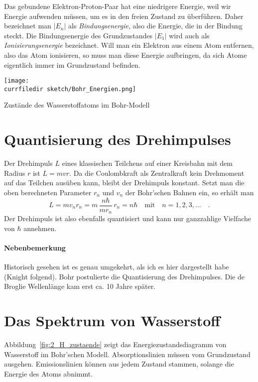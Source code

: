 Das gebundene Elektron-Proton-Paar hat eine niedrigere Energie, weil wir Energie aufwenden müssen, um es in den freien Zustand zu überführen. Daher bezeichnet man $|E_n|$ als \emph{Bindungsenergie}, also die Energie, die in der Bindung steckt. Die Bindungsenergie des Grundzustandes $|E_1|$ wird auch als \emph{Ionisierungsenergie} bezeichnet. Will man ein Elektron aus einem Atom entfernen, also das Atom ionisieren, so muss man diese Energie aufbringen, da sich Atome eigentlich immer im Grundzustand befinden. 

\begin{marginfigure}
    \texttt{[image: \\currfiledir sketch/Bohr\_Energien.png]}
    \caption{Zustände des Wasserstoffatoms im Bohr-Modell}
    \label{fig:2_H_zustaende}
 \end{marginfigure}


\section{Quantisierung des Drehimpulses}

Der Drehimpuls $L$ eines klassischen Teilchens auf einer Kreisbahn mit dem Radius $r$ ist $L = m v r$.
Da die Coulombkraft als Zentralkraft kein Drehmoment auf das Teilchen ausüben kann, bleibt der Drehimpuls konstant. Setzt man die oben berechneten Parameter $r_n$ und $v_n$ der Bohr'schen Bahnen ein, so erhält man
\begin{equation}
    L = m v_n r_n = m  \, \frac{n \hbar}{m r_n} \, r_n = n \hbar \quad \text{mit} \quad n = 1, 2, 3, \dots \quad .
\end{equation}
Der Drehimpuls ist also ebenfalls quantisiert und kann nur ganzzahlige Vielfache von $\hbar$ annehmen.

\paragraph*{Nebenbemerkung} Historisch gesehen ist es genau umgekehrt, als ich es hier dargestellt habe (Knight folgend). Bohr postulierte die Quantisierung des Drehimpulses. Die de Broglie Wellenlänge kam erst ca. 10 Jahre später.


\section{Das Spektrum von Wasserstoff}

Abbildung~\ref{fig:2_H_zustaende} zeigt das Energiezustandsdiagramm von Wasserstoff im Bohr'schen Modell. Absorptionslinien müssen vom Grundzustand ausgehen. Emissionslinien können aus jedem Zustand stammen, solange die Energie des Atoms abnimmt.

